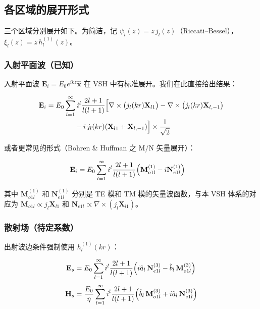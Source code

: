 \subsection{各区域的展开形式}

三个区域分别展开如下。为简洁，记 $\psi_l(z) = z\,j_l(z)$（Riccati--Bessel），$\xi_l(z) = z\,h_l^{(1)}(z)$。

\subsubsection{入射平面波（已知）}

入射平面波 $\mathbf{E}_i = E_0 e^{ikz}\hat{\mathbf{x}}$ 在 VSH 中有标准展开。我们在此直接给出结果：

\begin{align}
  \mathbf{E}_i &= E_0\sum_{l=1}^\infty i^l\frac{2l+1}{l(l+1)}\Bigl[
    \nabla\times\bigl(j_l(kr)\mathbf{X}_{l1}\bigr)
    - \nabla\times\bigl(j_l(kr)\mathbf{X}_{l,-1}\bigr) \notag\\
    &\qquad\qquad - i\,j_l(kr)(\mathbf{X}_{l1} + \mathbf{X}_{l,-1})
  \Bigr] \times \frac{1}{\sqrt{2}} \label{eq:Mie_planewave}
\end{align}

或者更常见的形式（Bohren \& Huffman 之 M/N 矢量展开）：

\begin{align}
  \mathbf{E}_i &= E_0\sum_{l=1}^\infty i^l\frac{2l+1}{l(l+1)}\Bigl(
    \mathbf{M}_{o1l}^{(1)} - i\mathbf{N}_{e1l}^{(1)}\Bigr) \label{eq:mie_pw_MN}
\end{align}

其中 $\mathbf{M}_{o1l}^{(1)}$ 和 $\mathbf{N}_{e1l}^{(1)}$ 分别是 TE 模和 TM 模的矢量波函数，与本 VSH 体系的对应为 $\mathbf{M}_{o1l} \propto j_l\mathbf{X}_{l1}$ 和 $\mathbf{N}_{e1l} \propto \nabla\times(j_l\mathbf{X}_{l1})$。

\subsubsection{散射场（待定系数）}

出射波边条件强制使用 $h_l^{(1)}(kr)$：

\begin{align}
  \mathbf{E}_s &= E_0\sum_{l=1}^\infty i^l\frac{2l+1}{l(l+1)}\Bigl(
    i\tilde{a}_l\,\mathbf{N}_{e1l}^{(3)} - \tilde{b}_l\,\mathbf{M}_{o1l}^{(3)}\Bigr) \label{eq:mie_Es}\\[0.3em]
  \mathbf{H}_s &= \frac{E_0}{\eta}\sum_{l=1}^\infty i^l\frac{2l+1}{l(l+1)}\Bigl(
    \tilde{b}_l\,\mathbf{M}_{o1l}^{(3)} + i\tilde{a}_l\,\mathbf{N}_{e1l}^{(3)}\Bigr) \label{eq:mie_Hs}
\end{align}

